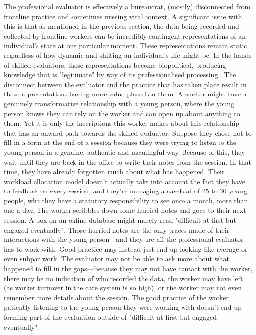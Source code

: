 The professional evaluator is effectively a bureaucrat, (mostly) disconnected from frontline practice and sometimes missing vital context. A significant issue with this is that as mentioned in the previous section, the data being recorded and collected by frontline workers can be incredibly contingent representations of an individual's state at one particular moment. These representations remain static regardless of how dynamic and shifting an individual's life might be. In the hands of skilled evaluators, these representations become biopolitical, producing knowledge that is "legitimate" by way of its professionalised processing \citep{foucault_power_2002}. The disconnect between the evaluator and the practice that has taken place result in these representations having more value placed on them. A worker might have a genuinely transformative relationship with a young person, where the young person knows they can rely on the worker and can open up about anything to them. Yet it is only the inscriptions this worker makes about this relationship that has an onward path towards the skilled evaluator. Suppose they chose not to fill in a form at the end of a session because they were trying to listen to the young person in a genuine, authentic and meaningful way. Because of this, they wait until they are back in the office to write their notes from the session. In that time, they have already forgotten much about what has happened. Their workload allocation model doesn't actually take into account the fact they have to feedback on every session, and they're managing a caseload of 25 to 30 young people, who they have a statutory responsibility to see once a month, more than one a day. The worker scribbles down some hurried notes and goes to their next session. A box on an online database might merely read "difficult at first but engaged eventually". Those hurried notes are the only traces made of their interactions with the young person—and they are all the professional evaluator has to work with. Good practice may instead just end up looking like average or even subpar work. The evaluator may not be able to ask more about what happened to fill in the gaps—because they may not have contact with the worker, there may be no indication of who recorded the data, the worker may have left (as worker turnover in the care system is so high), or the worker may not even remember more details about the session. The good practice of the worker patiently listening to the young person they were working with doesn't end up forming part of the evaluation outside of "difficult at first but engaged eventually". 


